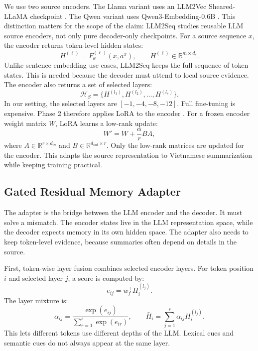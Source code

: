 \documentclass[11pt]{article}
\begin{document}
We use two source encoders.
The Llama variant uses an LLM2Vec Sheared-LLaMA checkpoint \citep{behnamghader2024llm2vec}.
The Qwen variant uses Qwen3-Embedding-0.6B \citep{zhang2025qwen3embedding}.
This distinction matters for the scope of the claim: LLM2Seq studies reusable LLM source encoders, not only pure decoder-only checkpoints.
For a source sequence $x$, the encoder returns token-level hidden states:
\begin{equation}
H^{(\ell)}=F^{(\ell)}_{\theta}(x,a^x),
\qquad
H^{(\ell)}\in\mathbb{R}^{m\times d_e}.
\end{equation}
Unlike sentence embedding use cases, LLM2Seq keeps the full sequence of token states.
This is needed because the decoder must attend to local source evidence.
The encoder also returns a set of selected layers:
\begin{equation}
\mathcal{H}_S=\{H^{(l_1)},H^{(l_2)},\ldots,H^{(l_s)}\}.
\end{equation}
In our setting, the selected layers are $[-1,-4,-8,-12]$.
Full fine-tuning is expensive.
Phase 2 therefore applies LoRA to the encoder \citep{hu2022lora}.
For a frozen encoder weight matrix $W$, LoRA learns a low-rank update:
\begin{equation}
W'=W+\frac{\alpha}{r}BA,
\end{equation}
where $A\in\mathbb{R}^{r\times d_{in}}$ and
$B\in\mathbb{R}^{d_{out}\times r}$.
Only the low-rank matrices are updated for the encoder.
This adapts the source representation to Vietnamese summarization while keeping training practical.

\subsection{Gated Residual Memory Adapter}

The adapter is the bridge between the LLM encoder and the decoder.
It must solve a mismatch.
The encoder states live in the LLM representation space, while the decoder expects memory in its own hidden space.
The adapter also needs to keep token-level evidence, because summaries often depend on details in the source.

First, token-wise layer fusion combines selected encoder layers.
For token position $i$ and selected layer $j$, a score is computed by:
\begin{equation}
e_{ij}=w_f^\top H^{(l_j)}_i.
\end{equation}
The layer mixture is:
\begin{equation}
\alpha_{ij}
=\frac{\exp(e_{ij})}{\sum_{r=1}^{s}\exp(e_{ir})},
\qquad
\bar{H}_i=\sum_{j=1}^{s}\alpha_{ij}H^{(l_j)}_i.
\end{equation}
This lets different tokens use different depths of the LLM.
Lexical cues and semantic cues do not always appear at the same layer.
\end{document}
